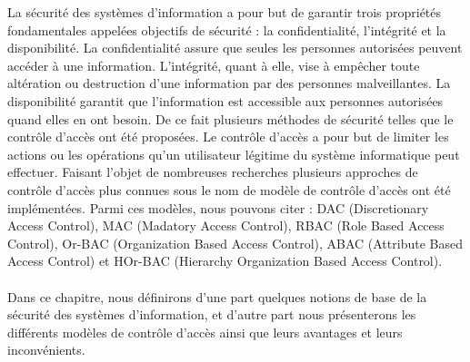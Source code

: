 \label{chapEtatDeLart}

\label{sectionIntroduction}

La sécurité des systèmes d'information a pour but de garantir trois propriétés fondamentales appelées objectifs de sécurité : la confidentialité, l'intégrité et la disponibilité. La confidentialité assure que seules les personnes autorisées peuvent accéder à une information. L'intégrité, quant à elle,  vise à empêcher toute altération ou destruction d'une information par des personnes malveillantes. La disponibilité garantit que l'information est accessible aux personnes autorisées quand elles en ont besoin. De ce fait plusieurs méthodes de sécurité telles que le contrôle d'accès ont été proposées. Le contrôle d'accès a pour but de limiter les actions ou les opérations qu'un utilisateur légitime du système informatique peut effectuer. Faisant l'objet de nombreuses recherches plusieurs approches de contrôle d'accès plus connues sous le nom de modèle de contrôle d'accès ont été implémentées. Parmi ces modèles, nous pouvons citer : DAC (Discretionary Access Control), MAC (Madatory Access Control), RBAC (Role Based Access Control), Or-BAC (Organization Based Access Control), ABAC (Attribute Based Access Control) et HOr-BAC (Hierarchy Organization Based Access Control).

\paragraph{} Dans ce chapitre, nous définirons d'une part quelques notions de base de la sécurité des systèmes d'information, et d'autre part nous présenterons les différents modèles de contrôle d'accès ainsi que leurs avantages et leurs inconvénients.





